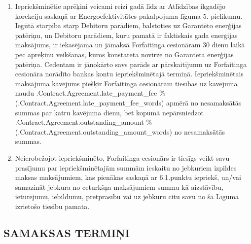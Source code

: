 \documentclass[a4paper]{article}
\begin{document}
\begin{enumerate}
\item{Iepriekšminētie aprēķini veicami reizi gadā līdz ar Atlīdzības ikgadējo korekciju saskaņā ar
Energoefektivitātes pakalpojuma līguma 5. pielikumu. Iegūtā starpība starp Debitoru parādiem,
balstoties uz Garantēto enerģijas patēriņu, un Debitoru parādiem, kuru pamatā ir faktiskais gada
enerģijas maksājums, ir iekasējama un jāmaksā Forfaitinga cesionāram 30 dienu laikā pēc
aprēķinu veikšanas, kuros konstatēta novirze no Garantētā enerģijas patēriņa. Cedentam ir
jānokārto savs parāds ar pārskaitījumu uz Forfaitinga cesionāra norādīto bankas kontu
iepriekšminētajā termiņā. Iepriekšminētais maksājuma kavējums piešķir Forfaitinga cesionāram
tiesības uz kavējuma naudu \iffalse input forfaitingFields.late_payment_fee value="{{.Contract.Agreement.late_payment_fee}}" type="number" \fi {{.Contract.Agreement.late_payment_fee}} \%
    (\iffalse input forfaitingFields.late_payment_fee_words value="{{.Contract.Agreement.late_payment_fee_words}}" \fi {{.Contract.Agreement.late_payment_fee_words}}) apmērā no nesamaksātās
summas par katru kavējuma dienu, bet kopumā nepārsniedzot \iffalse input forfaitingFields.outstanding_amount value="{{.Contract.Agreement.outstanding_amount}}" type="number" \fi {{.Contract.Agreement.outstanding_amount}}
    \%(\iffalse input forfaitingFields.outstanding_amount_words value="{{.Contract.Agreement.outstanding_amount_words}}" \fi {{.Contract.Agreement.outstanding_amount_words}}) no nesamaksātās summas.}

\item{Neierobežojot iepriekšminēto, Forfaitinga cesionārs ir tiesīgs veikt savu prasījumu par
iepriekšminētajām summām ieskaitu no jebkuriem izpildes maksas maksājumiem, kas pienākas
saskaņā ar 6.1.punktu iepriekš, un/vai samazināt jebkura no ceturkšņa maksājumiem summu kā
aizstāvību, ieturējumu, iebildumu, pretprasību vai uz jebkuru citu savu no šā Līguma izrietošo
tiesību pamata.}
\end{enumerate}

\subsection{SAMAKSAS TERMIŅI}
\end{document}
